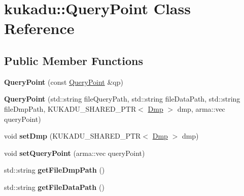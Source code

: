 \hypertarget{classkukadu_1_1QueryPoint}{\section{kukadu\-:\-:Query\-Point Class Reference}
\label{classkukadu_1_1QueryPoint}
}
\subsection*{Public Member Functions}
\begin{DoxyCompactItemize}
\item 
\hypertarget{classkukadu_1_1QueryPoint_a9a5ddbc46dc20f520b466ccc3c25c691}{{\bfseries Query\-Point} (const \hyperlink{classkukadu_1_1QueryPoint}{Query\-Point} \&qp)}\label{classkukadu_1_1QueryPoint_a9a5ddbc46dc20f520b466ccc3c25c691}

\item 
\hypertarget{classkukadu_1_1QueryPoint_a85ff441f9ac371bf1f47482c82fe2f13}{{\bfseries Query\-Point} (std\-::string file\-Query\-Path, std\-::string file\-Data\-Path, std\-::string file\-Dmp\-Path, K\-U\-K\-A\-D\-U\-\_\-\-S\-H\-A\-R\-E\-D\-\_\-\-P\-T\-R$<$ \hyperlink{classkukadu_1_1Dmp}{Dmp} $>$ dmp, arma\-::vec query\-Point)}\label{classkukadu_1_1QueryPoint_a85ff441f9ac371bf1f47482c82fe2f13}

\item 
\hypertarget{classkukadu_1_1QueryPoint_a205098f0b021010a83b3b70648e6c595}{void {\bfseries set\-Dmp} (K\-U\-K\-A\-D\-U\-\_\-\-S\-H\-A\-R\-E\-D\-\_\-\-P\-T\-R$<$ \hyperlink{classkukadu_1_1Dmp}{Dmp} $>$ dmp)}\label{classkukadu_1_1QueryPoint_a205098f0b021010a83b3b70648e6c595}

\item 
\hypertarget{classkukadu_1_1QueryPoint_a7f239b2985488650e941695d21eac947}{void {\bfseries set\-Query\-Point} (arma\-::vec query\-Point)}\label{classkukadu_1_1QueryPoint_a7f239b2985488650e941695d21eac947}

\item 
\hypertarget{classkukadu_1_1QueryPoint_a7daf2238dc957d79bb42022102217655}{std\-::string {\bfseries get\-File\-Dmp\-Path} ()}\label{classkukadu_1_1QueryPoint_a7daf2238dc957d79bb42022102217655}

\item 
\hypertarget{classkukadu_1_1QueryPoint_af6c968a3263c590334df7b26169322cf}{std\-::string {\bfseries get\-File\-Data\-Path} ()}\label{classkukadu_1_1QueryPoint_af6c968a3263c590334df7b26169322cf}


\end{DoxyCompactItemize}
